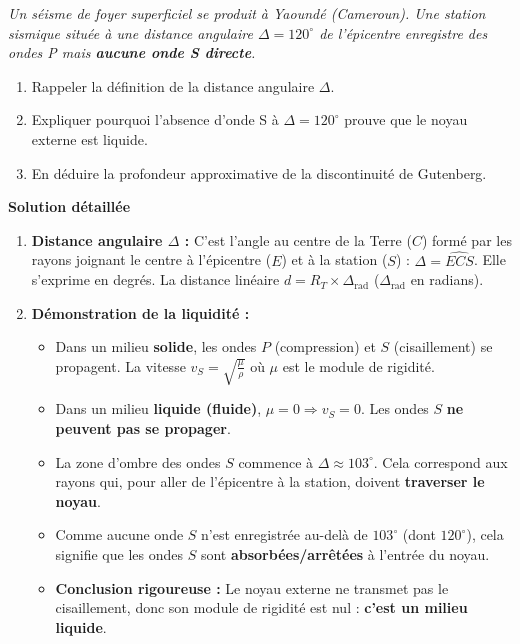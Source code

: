 \documentclass[11pt]{article}
\begin{document}
\begin{exoresolu}
\emph{Un séisme de foyer superficiel se produit à Yaoundé (Cameroun). Une station sismique située à une distance angulaire $\Delta = 120^\circ$ de l'épicentre enregistre des ondes P mais \textbf{aucune onde S directe}.}
\begin{enumerate}
    \item Rappeler la définition de la distance angulaire $\Delta$.
    \item Expliquer pourquoi l'absence d'onde S à $\Delta = 120^\circ$ prouve que le noyau externe est liquide.
    \item En déduire la profondeur approximative de la discontinuité de Gutenberg.
\end{enumerate}
\tcblower
\textbf{Solution détaillée}
\begin{enumerate}
    \item \textbf{Distance angulaire $\Delta$ :} C'est l'angle au centre de la Terre ($C$) formé par les rayons joignant le centre à l'épicentre ($E$) et à la station ($S$) : $\Delta = \widehat{ECS}$. Elle s'exprime en degrés. La distance linéaire $d = R_T \times \Delta_{\text{rad}}$ ($\Delta_{\text{rad}}$ en radians).

    \item \textbf{Démonstration de la liquidité :}
    \begin{itemize}
        \item Dans un milieu \textbf{solide}, les ondes $P$ (compression) et $S$ (cisaillement) se propagent. La vitesse $v_S = \sqrt{\frac{\mu}{\rho}}$ où $\mu$ est le module de rigidité.
        \item Dans un milieu \textbf{liquide (fluide)}, $\mu = 0 \Rightarrow v_S = 0$. Les ondes $S$ \textbf{ne peuvent pas se propager}.
        \item La zone d'ombre des ondes $S$ commence à $\Delta \approx 103^\circ$. Cela correspond aux rayons qui, pour aller de l'épicentre à la station, doivent \textbf{traverser le noyau}.
        \item Comme aucune onde $S$ n'est enregistrée au-delà de $103^\circ$ (dont $120^\circ$), cela signifie que les ondes $S$ sont \textbf{absorbées/arrêtées} à l'entrée du noyau.
        \item \textbf{Conclusion rigoureuse :} Le noyau externe ne transmet pas le cisaillement, donc son module de rigidité est nul : \textbf{c'est un milieu liquide}.
    \end{itemize}


\end{enumerate}
\end{exoresolu}
\end{document}
